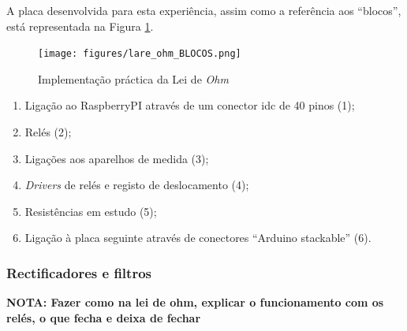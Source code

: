 A placa desenvolvida para esta experiência, assim como a referência aos ``blocos'', está representada na Figura \ref{fig:placaleideohm}. 

\begin{figure}[hbtp]
	\centering
	\texttt{[image: figures/lare\_ohm\_BLOCOS.png]}
	\caption{Implementação práctica da Lei de \textit{Ohm}}
	\label{fig:placaleideohm}
\end{figure}

\begin{enumerate}
	\item Ligação ao \gls{RaspberryPI} através de um conector \acrfull{idc} de 40 pinos (1);
	\item Relés (2);
	\item Ligações aos aparelhos de medida (3);
	\item \textit{Drivers} de relés e registo de deslocamento (4);
	\item Resistências em estudo (5);
	\item Ligação à placa seguinte através de conectores ``Arduino stackable'' (6).
\end{enumerate}

\subsubsection{Rectificadores e filtros}
\label{sec:rectificadoresfiltros}
\textbf{NOTA: Fazer como na lei de ohm, explicar o funcionamento com os relés, o que fecha e deixa de fechar}

